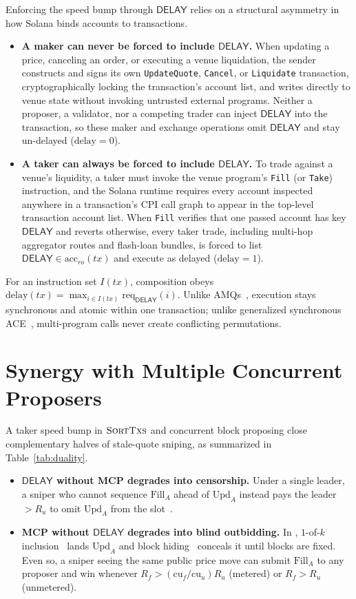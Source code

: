 \documentclass[10pt,a4paper]{article}
\newcommand{\DelaySym}{\mathsf{DELAY}}
\newcommand{\SortTxs}{\textsc{SortTxs}}
\newcommand{\NewCon}{\text{NewCon}}
\begin{document}
Enforcing the speed bump through $\DelaySym$ relies on a structural asymmetry in how Solana binds accounts to transactions.
\begin{itemize}[nosep,leftmargin=1.5em]
  \item \textbf{A maker can never be forced to include $\DelaySym$.} When updating a price, canceling an order, or executing a venue liquidation, the sender constructs and signs its own \texttt{UpdateQuote}, \texttt{Cancel}, or \texttt{Liquidate} transaction, cryptographically locking the transaction's account list, and writes directly to venue state without invoking untrusted external programs. Neither a proposer, a validator, nor a competing trader can inject $\DelaySym$ into the transaction, so these maker and exchange operations omit $\DelaySym$ and stay un-delayed ($\mathrm{delay}=0$).
  \item \textbf{A taker can always be forced to include $\DelaySym$.} To trade against a venue's liquidity, a taker must invoke the venue program's \texttt{Fill} (or \texttt{Take}) instruction, and the Solana runtime requires every account inspected anywhere in a transaction's CPI call graph to appear in the top-level transaction account list. When \texttt{Fill} verifies that one passed account has key $\DelaySym$ and reverts otherwise, every taker trade, including multi-hop aggregator routes and flash-loan bundles, is forced to list $\DelaySym \in \mathrm{acc}_{ro}(\mathit{tx})$ and execute as delayed ($\mathrm{delay}=1$).
\end{itemize}
For an instruction set $I(\mathit{tx})$, composition obeys $\mathrm{delay}(\mathit{tx}) = \max_{i \in I(\mathit{tx})} \mathrm{req}_{\DelaySym}(i)$. Unlike AMQs~\cite{CP25}, execution stays synchronous and atomic within one transaction; unlike generalized synchronous ACE~\cite{Can26}, multi-program calls never create conflicting permutations.

\section{Synergy with Multiple Concurrent Proposers}

A taker speed bump in $\SortTxs$ and concurrent block proposing close complementary halves of stale-quote sniping, as summarized in Table~\ref{tab:duality}.
\begin{itemize}[nosep,leftmargin=1.5em]
  \item \textbf{$\DelaySym$ without MCP degrades into censorship.} Under a single leader, a sniper who cannot sequence $\text{Fill}_A$ ahead of $\text{Upd}_A$ instead pays the leader $> R_u$ to omit $\text{Upd}_A$ from the slot~\cite{FPR23}.
  \item \textbf{MCP without $\DelaySym$ degrades into blind outbidding.} In \NewCon, $1$-of-$k$ inclusion~\cite[Thm.~2.2]{KW26c} lands $\text{Upd}_A$ and block hiding~\cite[Thm.~2.3]{KW26c} conceals it until blocks are fixed. Even so, a sniper seeing the same public price move can submit $\text{Fill}_A$ to any proposer and win whenever $R_f > (\mathrm{cu}_f/\mathrm{cu}_u) R_u$ (metered) or $R_f > R_u$ (unmetered).
\end{itemize}
\end{document}
